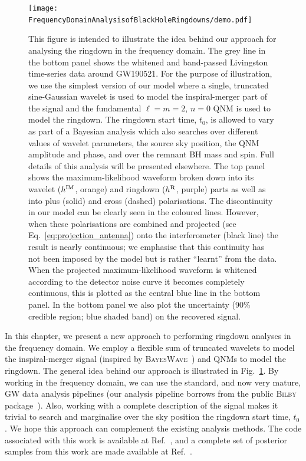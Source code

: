 \begin{figure}[t!]
    \centering
    \texttt{[image: FrequencyDomainAnalysisofBlackHoleRingdowns/demo.pdf]}
    \caption[Illustration of the frequency-domain ringdown analysis method]{ 
    This figure is intended to illustrate the idea behind our approach for analysing the ringdown in the frequency domain.
    The grey line in the bottom panel shows the whitened and band-passed Livingston time-series data around GW190521.
    For the purpose of illustration, we use the simplest version of our model where a single, truncated sine-Gaussian wavelet is used to model the inspiral-merger part of the signal and the fundamental $\ell=m=2$, $n=0$ QNM is used to model the ringdown.
    The ringdown start time, $t_0$, is allowed to vary as part of a Bayesian analysis which also searches over different values of wavelet parameters, the source sky position, the QNM amplitude and phase, and over the remnant BH mass and spin. 
    Full details of this analysis will be presented elsewhere.
    The top panel shows the maximum-likelihood waveform broken down into its wavelet ($h^{\rm IM}$, orange) and ringdown ($h^{\rm R}$, purple) parts as well as into plus (solid) and cross (dashed) polarisations. 
    The discontinuity in our model can be clearly seen in the coloured lines. 
    However, when these polarisations are combined and projected (see Eq.~\ref{eq:projection_antenna}) onto the interferometer (black line) the result is nearly continuous; we emphasise that this continuity has not been imposed by the model but is rather ``learnt'' from the data. When the projected maximum-likelihood waveform is whitened according to the detector noise curve it becomes completely continuous, this is plotted as the central blue line in the bottom panel.
    In the bottom panel we also plot the uncertainty (90\% credible region; blue shaded band) on the recovered signal.
    }
    \label{fig:demo}
\end{figure}

In this chapter, we present a new approach to performing ringdown analyses in the frequency domain. 
We employ a flexible sum of truncated wavelets to model the inspiral-merger signal (inspired by \textsc{BayesWave}~\cite{Cornish:2014kda, Cornish:2020dwh}) and QNMs to model the ringdown.
The general idea behind our approach is illustrated in Fig.~\ref{fig:demo}.
By working in the frequency domain, we can use the standard, and now very mature, GW data analysis pipelines (our analysis pipeline borrows from the public \textsc{Bilby} package~\cite{Ashton:2018jfp}).
Also, working with a complete description of the signal makes it trivial to search and marginalise over the sky position the ringdown start time, $t_0$. 
We hope this approach can complement the existing analysis methods.
The code associated with this work is available at Ref.~\cite{fdringdown}, and a complete set of posterior samples from this work are made available at Ref.~\cite{finch_eliot_2021_5569759}.

